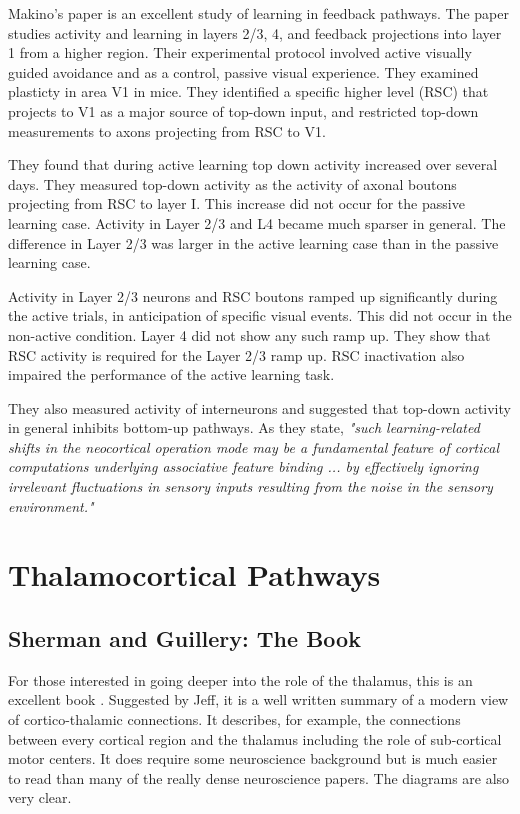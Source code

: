 \documentclass{article} %
\begin{document}
Makino's paper \cite{Makino2015} is an excellent study of learning in feedback
pathways. The paper studies activity and learning in layers 2/3, 4, and feedback
projections into layer 1 from a higher region. Their experimental protocol
involved active visually guided avoidance and as a control, passive visual
experience. They examined plasticty in area V1 in mice. They identified a
specific higher level (RSC) that projects to V1 as a major source of top-down
input, and restricted top-down measurements to axons projecting from RSC to V1.

They found that during active learning top down activity increased over several
days. They measured  top-down activity as  the activity of axonal boutons
projecting from RSC to layer I. This increase did not occur for the passive
learning case. Activity in Layer 2/3 and L4 became much sparser in general. The
difference in Layer 2/3 was larger in the active learning case than in the
passive learning case.

Activity in Layer 2/3 neurons and RSC boutons ramped up significantly during the
active trials, in anticipation of specific visual events.  This did not occur
in the non-active condition.  Layer 4 did not show any such ramp up.  They show
that RSC activity is required for the Layer 2/3 ramp up. RSC inactivation also
impaired the performance of the active learning task.

They also measured activity of interneurons and suggested that top-down activity
in general inhibits bottom-up pathways. As they state, \emph{"such learning-related
shifts in the neocortical operation mode may be a fundamental feature of
cortical computations underlying associative feature binding ... by effectively
ignoring irrelevant fluctuations in sensory inputs resulting from the noise in
the sensory environment."}



\section{Thalamocortical Pathways}

\subsection{Sherman and Guillery: The Book}

For those interested in going deeper into the role of the thalamus, this is an
excellent book \cite{Sherman}. Suggested by Jeff, it is a well written summary
of a modern view of cortico-thalamic connections. It describes, for example, the
connections between every cortical region and the thalamus including the role of
sub-cortical motor centers. It does require some neuroscience background but is
much easier to read than many of the really dense neuroscience papers. The
diagrams are also very clear.
\end{document}
